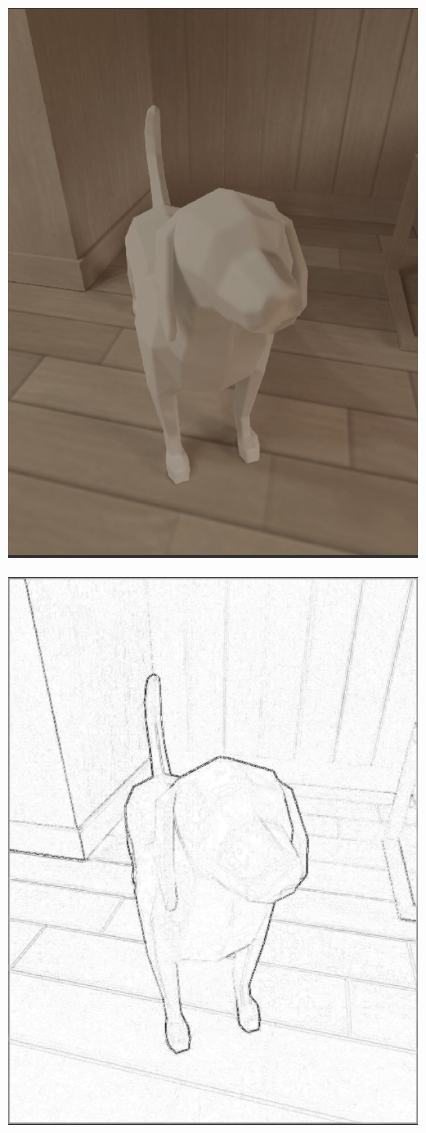 \documentclass[12pt]{article}
\begin{document}
\begin{itemize}
\begin{itemize}
    \includegraphics{dog_original}

    \includegraphics{dog_crayon}


\end{itemize}
\end{itemize}
\end{document}
